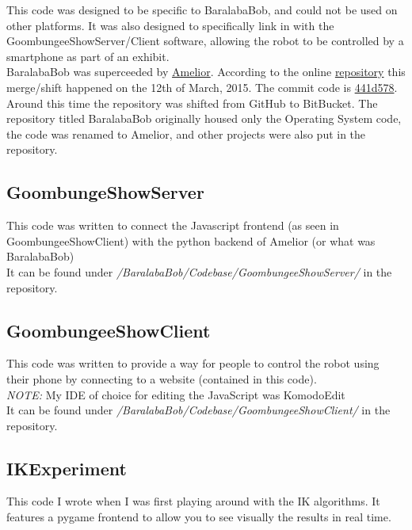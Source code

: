 				This code was designed to be specific to BaralabaBob, and could not be used on other platforms. It was also designed to specifically link in with the GoombungeeShowServer/Client software, allowing the robot to be controlled by a smartphone as part of an exhibit.\\
				
				
				BaralabaBob was superceeded by \hyperref[Amelior]{Amelior}. According to the online \hyperref[Repository]{repository} this merge/shift happened on the 12th of March, 2015. The commit code is  \href{https://bitbucket.org/boar401s2/baralababob/src/441d5788267d?at=master}{441d578}. Around this time the repository was shifted from GitHub to BitBucket. The repository titled BaralabaBob originally housed only the Operating System code, the code was renamed to Amelior, and other projects were also put in the repository.

			\subsection{GoombungeShowServer}
				This code was written to connect the Javascript frontend (as seen in GoombungeeShowClient) with the python backend of Amelior (or what was BaralabaBob)\\
				
				It can be found under \textit{/BaralabaBob/Codebase/GoombungeeShowServer/} in the repository.

			\subsection{GoombungeeShowClient}
				This code was written to provide a way for people to control the robot using their phone by connecting to a website (contained in this code).\\
				
				\textit{NOTE: } My IDE of choice for editing the JavaScript was KomodoEdit\\
				
				It can be found under \textit{/BaralabaBob/Codebase/GoombungeeShowClient/} in the repository.

			\subsection{IKExperiment}
			This code I wrote when I was first playing around with the IK algorithms. It features a pygame frontend to allow you to see visually the results in real time.\\
			
